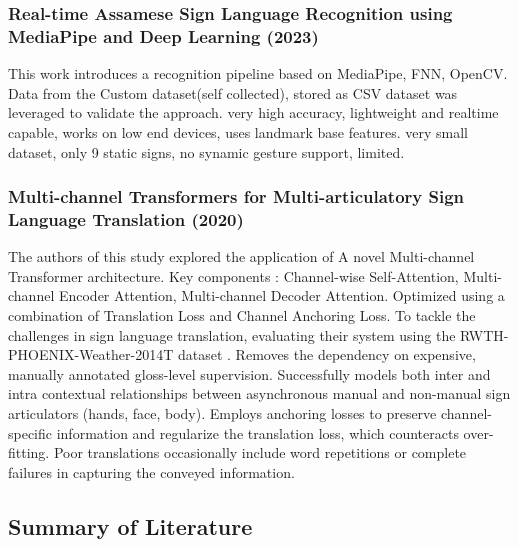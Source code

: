 \subsubsection{Real-time Assamese Sign Language Recognition using MediaPipe and Deep Learning (2023)}
This work introduces a recognition pipeline based on MediaPipe, FNN, OpenCV. Data from the Custom dataset(self collected), stored as CSV dataset was leveraged to validate the approach. very high accuracy, lightweight and realtime capable, works on low end devices, uses landmark base features. very small dataset, only 9 static signs, no synamic gesture support, limited.\cite{study_assamese_slr_2023}

\subsubsection{Multi-channel Transformers for Multi-articulatory Sign Language Translation (2020)}
The authors of this study explored the application of A novel Multi-channel Transformer architecture. Key components : Channel-wise Self-Attention, Multi-channel Encoder Attention, Multi-channel Decoder Attention. Optimized using a combination of Translation Loss and Channel Anchoring Loss. To tackle the challenges in sign language translation, evaluating their system using the RWTH-PHOENIX-Weather-2014T dataset \cite{102}. Removes the dependency on expensive, manually annotated gloss-level supervision. Successfully models both inter and intra contextual relationships between asynchronous manual and non-manual sign articulators (hands, face, body). Employs anchoring losses to preserve channel-specific information and regularize the translation loss, which counteracts over-fitting. Poor translations occasionally include word repetitions or complete failures in capturing the conveyed information.\cite{study_multichannel_trans_2020}

\subsection{Summary of Literature}

